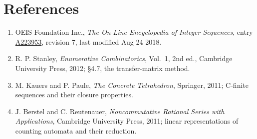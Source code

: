 \documentclass[11pt]{article}
\theoremstyle{definition}
\begin{document}
\section{References}

\begin{enumerate}

\item OEIS Foundation Inc., \emph{The On-Line Encyclopedia of Integer Sequences}, entry \href{https://oeis.org/A223953}{A223953}, revision 7, last modified Aug 24 2018.

\item R. P. Stanley, \emph{Enumerative Combinatorics}, Vol.~1, 2nd ed., Cambridge University Press, 2012; \S4.7, the transfer-matrix method.

\item M. Kauers and P. Paule, \emph{The Concrete Tetrahedron}, Springer, 2011; C-finite sequences and their closure properties.

\item J. Berstel and C. Reutenauer, \emph{Noncommutative Rational Series with Applications}, Cambridge University Press, 2011; linear representations of counting automata and their reduction.

\end{enumerate}
\end{document}
